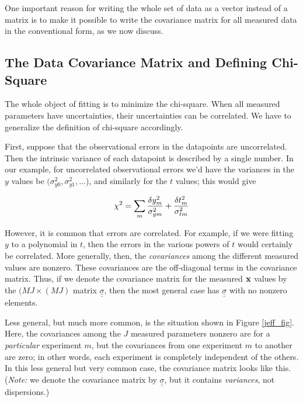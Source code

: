 \documentclass[psfig,preprint]{aastex}
\begin{document}
\noindent One important reason for writing the whole set of data as a
vector instead of a matrix is to make it possible to write the
covariance matrix for all measured data in the conventional form, as we
now discuss.

\subsection{ The Data Covariance Matrix and Defining Chi-Square}

The whole object of fitting is to minimize the chi-square.  When all
measured parameters have uncertainties, their uncertainties can be
correlated. We have to generalize the definition of chi-square
accordingly.

First, suppose that the 
observational errors in the datapoints are uncorrelated.  Then the
intrinsic variance of each datapoint is described by a single number. 
In our example, for uncorrelated observational errors we'd have the
variances in the $y$ values be $(\sigma_{y0}^2, \sigma_{y1}^2, \dots$),
and similarly for the $t$ values; this would give

\begin {equation}
\chi^2 = \sum_m {\delta y_m^2 \over \sigma_{ym}^2}+ {\delta t_m^2 \over \sigma_{tm}^2}
\end{equation}

However, it is common that errors are correlated.  For example, if we
were fitting $y$ to a polynomial in $t$, then the errors in the various
powers of $t$ would certainly be correlated.  More generally, then, the
{\it covariances} among the different measured values are nonzero. 
These covariances are the off-diagonal terms in the covariance matrix. 
Thus, if we denote the covariance matrix for the measured $\bf x$ values
by the $(MJ \times (MJ)$ matrix $\underline{\underline{\sigma}}$, then
the most general case has $\underline{\underline{\sigma}}$ with no
nonzero elements. 

Less general, but much more common, is the situation shown in Figure
\ref{jeff_fig}.  Here, the covariances among the $J$ measured
parameters nonzero are for a {\it particular} experiment $m$, but the
covariances {from one experiment $m$ to another are zero}; in other
words, each experiment is completely independent of the others.  In this
less general but very common case, the covariance matrix looks like
this. ({\it Note:} we denote the covariance matrix by
  $\underline{\underline{\sigma}}$, but it contains {\it variances}, not
dispersions.)
 
\end{document}
